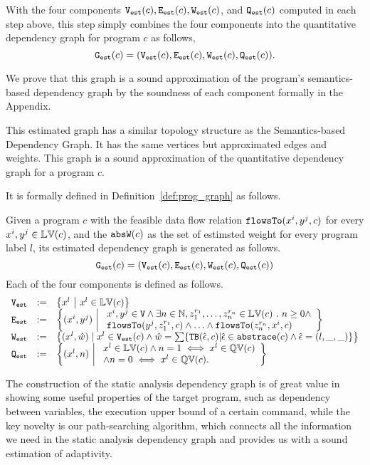With the four components $\mathtt{{V_{est}}}(c), \mathtt{{E_{est}}}(c), \mathtt{{W_{est}}}(c)$, and $\mathtt{{Q_{est}}}(c)$
computed in each step above, this step simply combines the four components into the quantitative dependency graph for program $c$ as follows,
 \[
 \mathtt{{G_{est}}}(c) = (\mathtt{{V_{est}}}(c), \mathtt{{E_{est}}}(c), \mathtt{{W_{est}}}(c), \mathtt{{Q_{est}}}(c)).
 \]

 We prove that this graph is a sound approximation of the program's semantics-based dependency graph by the soundness of each component formally in the Appendix.

This estimated graph has a similar topology structure as 
the Semantics-based Dependency Graph. It has the same
vertices 
but approximated edges and weights. 
This graph is a sound approximation of the quantitative dependency graph for a program $c$.

It is formally defined in Definition~\ref{def:prog_graph} as follows.

\begin{defn}
\label{def:prog_graph}
Given a program $c$ 
% 
with the feasible data flow relation $\mathtt{flowsTo}(x^i, y^j, c)$ for every $x^i, y^j \in \mathbb{LV}(c)$, 
and the $\mathtt{abs}{\mathtt{W}}(c)$ as the set of estimsted weight for every program label $l$,
its estimated dependency graph
is generated as follows.
\[\mathtt{{G_{est}}}(c) = (\mathtt{{V_{est}}}(c), \mathtt{{E_{est}}}(c), \mathtt{{W_{est}}}(c), \mathtt{{Q_{est}}}(c))\]
Each of the four components is defined as follows.
{\small
\[
\begin{array}{lll}
\progV & := & \left\{ 
x^l
~ \middle\vert ~
x^l \in \lvar(c)
\right\}
\\
\progE & := & 
\left\{ 
(x^i, y^j) 
~ \middle\vert ~
\begin{array}{l}
x^i, y^j \in \vertxs
\land
\exists n \in \mathbb{N}, z_1^{r_1}, \ldots, z_n^{r_n} \in \lvar(c) \st
n \geq 0 \land
\\
\flowsto(y^j, z_1^{r_1}, c) 
\land \ldots \land \flowsto(z_n^{r_n}, x^i, c) 
\end{array}
\right\}
\\
\progW & := &
\left\{ (x^l, \hat{w}) 
\mid
x^l \in \progV(c) \land 
\hat{w} = 
\sum\left\{ \absclr(\absevent, c) \middle\vert \absevent \in \absflow(c) \land \absevent = (l, \_, \_) \right\}
\right\}
\\
\progF & := & 
\left\{(x^l, n) 
~ \middle\vert ~
\begin{array}{l}
 x^l \in \lvar(c) \land
 n = 1 \iff x^l \in \qvar(c) \\
\land n = 0 \iff x^l \in \qvar(c) .
\end{array}
\right\}
\end{array}
\] }
\end{defn}
The construction of the static analysis dependency graph is of great value in showing some useful properties of the target program,
such as dependency between variables, the execution upper bound of a certain command,
while the key novelty is our path-searching algorithm, which connects all the information we need in the static analysis dependency graph and provides us with a sound estimation of adaptivity.

